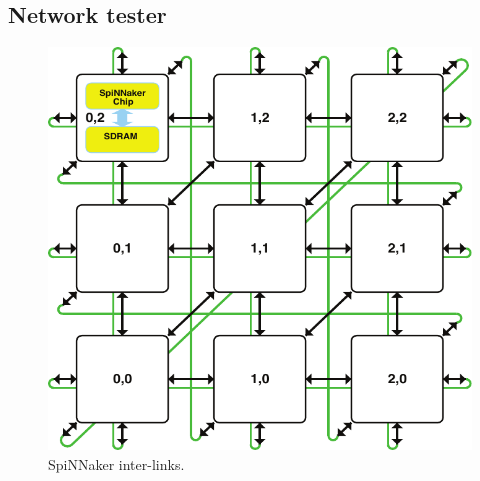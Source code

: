 \documentclass[a4paper, 11pt]{article}
\begin{document}
\subsection{Network tester}
\begin{figure}[htbp]
	\centering
	\includegraphics[width=0.35\linewidth]{images/system_architecture.pdf}
	\caption{SpiNNaker inter-links.}
	\label{fig:interchip_links}	
\end{figure}
\end{document}
